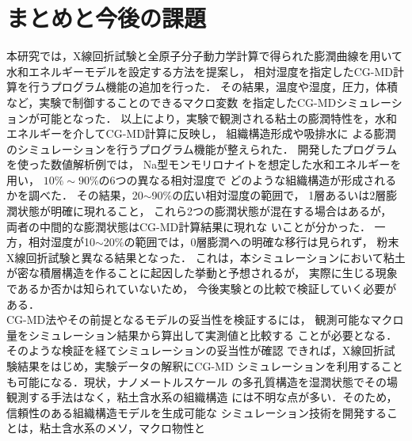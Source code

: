 ﻿\documentclass[11pt,a4j]{jarticle}
\begin{document}
\section{まとめと今後の課題}
本研究では，X線回折試験と全原子分子動力学計算で得られた膨潤曲線を用いて
水和エネルギーモデルを設定する方法を提案し，
相対湿度を指定したCG-MD計算を行うプログラム機能の追加を行った．
その結果，温度や湿度，圧力，体積など，実験で制御することのできるマクロ変数
を指定したCG-MDシミュレーションが可能となった．
以上により，実験で観測される粘土の膨潤特性を，水和エネルギーを介してCG-MD計算に反映し，
組織構造形成や吸排水に
よる膨潤のシミュレーションを行うプログラム機能が整えられた．
%
開発したプログラムを使った数値解析例では，
Na型モンモリロナイトを想定した水和エネルギーを用い，
$10\%\sim 90\%$の6つの異なる相対湿度で
どのような組織構造が形成されるかを調べた．
その結果，20$\sim$90$\%$の広い相対湿度の範囲で，
1層あるいは2層膨潤状態が明確に現れること，
これら2つの膨潤状態が混在する場合はあるが，
両者の中間的な膨潤状態はCG-MD計算結果に現れな
いことが分かった．
一方，相対湿度が10$\sim$20$\%$の範囲では，0層膨潤への明確な移行は見られず，
粉末X線回折試験と異なる結果となった．
これは，本シミュレーションにおいて粘土が密な積層構造を作ることに起因した挙動と予想されるが，
実際に生じる現象であるか否かは知られていないため，
今後実験との比較で検証していく必要がある．
\\
%
\hspace{\parindent}
CG-MD法やその前提となるモデルの妥当性を検証するには，
観測可能なマクロ量をシミュレーション結果から算出して実測値と比較する
ことが必要となる．そのような検証を経てシミュレーションの妥当性が確認
できれば，X線回折試験結果をはじめ，実験データの解釈にCG-MD
シミュレーションを利用することも可能になる．現状，ナノメートルスケール
の多孔質構造を湿潤状態でその場観測する手法はなく，粘土含水系の組織構造
には不明な点が多い．そのため，信頼性のある組織構造モデルを生成可能な
シミュレーション技術を開発することは，粘土含水系のメソ，マクロ物性と
\end{document}
